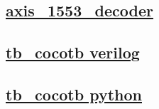 \documentclass{article}
\begin{document}
  


  \subsection{\href{../files/axis_1553_decoder-v.html}{axis\_1553\_decoder}}

  \subsection{\href{../files2/tb_cocotb-v.html}{tb\_cocotb verilog}}

  \subsection{\href{../files2/tb_cocotb-py.html}{tb\_cocotb python}}
\end{document}
